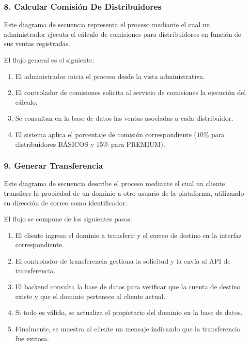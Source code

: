\subsubsection*{8. Calcular Comisión De Distribuidores}

Este diagrama de secuencia representa el proceso mediante el cual un administrador ejecuta el cálculo de comisiones para distribuidores en función de sus ventas registradas.

El flujo general es el siguiente:

\begin{enumerate}
    \item El administrador inicia el proceso desde la vista administrativa.
    \item El controlador de comisiones solicita al servicio de comisiones la ejecución del cálculo.
    \item Se consultan en la base de datos las ventas asociadas a cada distribuidor.
    \item El sistema aplica el porcentaje de comisión correspondiente ($10\% $ para distribuidores BÁSICOS y $15\%$ para PREMIUM).
\end{enumerate}

\subsubsection*{9. Generar Transferencia}

Este diagrama de secuencia describe el proceso mediante el cual un cliente transfiere la propiedad de un dominio a otro usuario de la plataforma, utilizando su dirección de correo como identificador.

El flujo se compone de los siguientes pasos:

\begin{enumerate}
    \item El cliente ingresa el dominio a transferir y el correo de destino en la interfaz correspondiente.
    \item El controlador de transferencia gestiona la solicitud y la envía al API de transferencia.
    \item El backend consulta la base de datos para verificar que la cuenta de destino existe y que el dominio pertenece al cliente actual.
    \item Si todo es válido, se actualiza el propietario del dominio en la base de datos.
    \item Finalmente, se muestra al cliente un mensaje indicando que la transferencia fue exitosa.
\end{enumerate}

